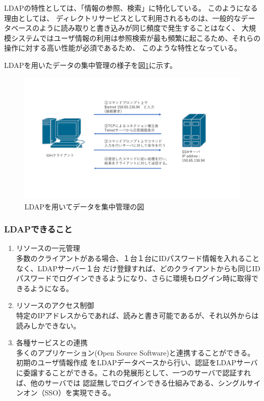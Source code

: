 \documentclass[11pt,a4j,titlepage]{jreport}
\begin{document}
LDAPの特性としては、「情報の参照、検索」に特化している。
このようになる理由としては、
ディレクトリサービスとして利用されるものは、一般的なデータベースのように読み取りと書き込みが同じ頻度で発生することはなく、
大規模システムではユーザ情報の利用は参照検索が最も頻繁に起こるため、それらの操作に対する高い性能が必須であるため、
このような特性となっている。

LDAPを用いたデータの集中管理の様子を図\ref{LDAP_data_manage}に示す。
\begin{figure}[tbp]
    \centering
    \includegraphics[width=1.0\textwidth, page=10]{graphs/network_archtecture.pdf}
    \caption{LDAPを用いてデータを集中管理の図}
    \label{LDAP_data_manage}
\end{figure}


\subsubsection*{LDAPできること}
\begin{enumerate}
    \setlength{\parskip}{0.05cm} %
    \setlength{\itemsep}{0.05cm}
    \item リソースの一元管理\mbox{}\\多数のクライアントがある場合、１台１台にIDパスワード情報を入れることなく、LDAPサーバー１台
だけ登録すれば、どのクライアントからも同じIDパスワードでログインできるようになり、さらに環境もログイン時に取得できるようになる。


    \item リソースのアクセス制御\mbox{}\\特定のIPアドレスからであれば、読みと書き可能であるが、それ以外からは読みしかできない。
    \item 各種サービスとの連携\mbox{}\\多くのアプリケーション(Open Source Software)と連携することができる。初期のユーザ情報作成
をLDAPデータベースから行い、認証をLDAPサーバに委譲することができる。これの発展形として、一つのサーバで認証すれば、他のサーバでは
認証無しでログインできる仕組みである、シングルサインオン（SSO）を実現できる。
\end{enumerate}
\end{document}
